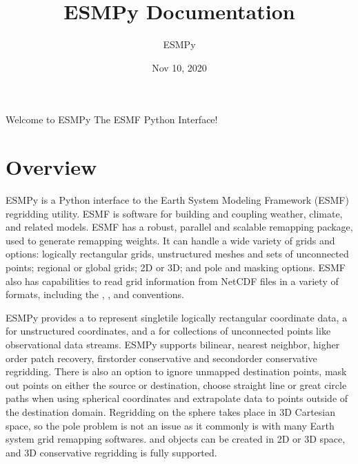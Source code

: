 \documentclass[letterpaper,10pt,english]{sphinxmanual}
\title{ESMPy Documentation}
\date{Nov 10, 2020}
\author{ESMPy}
\begin{document}
\pagestyle{empty}
\sphinxmaketitle
\pagestyle{plain}
\sphinxtableofcontents
\pagestyle{normal}
\label{\detokenize{index::doc}}


Welcome to ESMPy \sphinxhyphen{} The ESMF Python Interface!


\chapter{Overview}
\label{\detokenize{intro:module-ESMF}}\label{\detokenize{intro:overview}}\label{\detokenize{intro::doc}}
ESMPy is a Python interface to the Earth System Modeling Framework (ESMF) 
regridding utility. ESMF is software for
building and coupling weather, climate, and related models. ESMF has a robust,
parallel and scalable remapping package, used to generate remapping weights.
It can handle a wide variety of grids and options: logically rectangular grids,
unstructured meshes and sets of unconnected points; regional or global grids;
2D or 3D; and pole and masking options. ESMF also has capabilities to read grid
information from NetCDF files in a variety of formats, including the
,
,
and
conventions.

ESMPy provides a {\hyperref[\detokenize{grid:ESMF.api.grid.Grid}]{}} to represent single\sphinxhyphen{}tile logically
rectangular coordinate data, a {\hyperref[\detokenize{mesh:ESMF.api.mesh.Mesh}]{}} for unstructured 
coordinates, and a {\hyperref[\detokenize{locstream:ESMF.api.locstream.LocStream}]{}} for collections of
unconnected points like observational data streams.
ESMPy supports bilinear, nearest neighbor, higher order patch recovery, 
first\sphinxhyphen{}order conservative and second\sphinxhyphen{}order conservative regridding. There is 
also an option to ignore unmapped destination points, mask out points on either
the source or destination, choose straight line or great circle paths when using
spherical coordinates and extrapolate data to points outside of the destination
domain. Regridding on the sphere takes place in 3D Cartesian space, so the pole
problem is not an issue as it commonly is with many Earth system grid remapping
softwares. {\hyperref[\detokenize{grid:ESMF.api.grid.Grid}]{}} and {\hyperref[\detokenize{mesh:ESMF.api.mesh.Mesh}]{}} 
objects can be created in 2D or 3D space, and 3D conservative regridding is 
fully supported.
\end{document}
